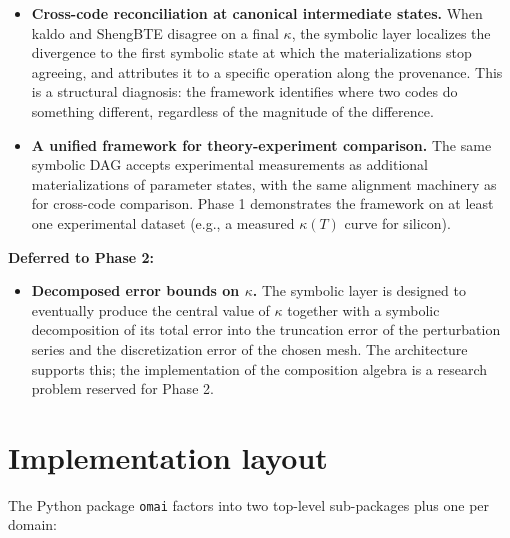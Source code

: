 \documentclass[11pt,a4paper]{article}
\begin{document}
\begin{itemize}[leftmargin=2em]
  \item \textbf{Cross-code reconciliation at canonical intermediate states.} When kaldo and
        ShengBTE disagree on a final $\kappa$, the symbolic layer localizes the divergence to the
        first symbolic state at which the materializations stop agreeing, and attributes it to a
        specific operation along the provenance. This is a structural diagnosis: the framework
        identifies where two codes do something different, regardless of the magnitude of the
        difference.
  \item \textbf{A unified framework for theory-experiment comparison.} The same symbolic DAG
        accepts experimental measurements as additional materializations of parameter states,
        with the same alignment machinery as for cross-code comparison. Phase 1 demonstrates the
        framework on at least one experimental dataset (e.g., a measured $\kappa(T)$ curve for
        silicon).
\end{itemize}

\noindent\textbf{Deferred to Phase 2:}
\begin{itemize}[leftmargin=2em]
  \item \textbf{Decomposed error bounds on $\kappa$.} The symbolic layer is designed to eventually
        produce the central value of $\kappa$ together with a symbolic decomposition of its
        total error into the truncation error of the perturbation series and the discretization
        error of the chosen mesh. The architecture supports this; the implementation of the
        composition algebra is a research problem reserved for Phase 2.
\end{itemize}

\section{Implementation layout}
\label{sec:layout}

The Python package \texttt{omai} factors into two top-level sub-packages
plus one per domain:
\end{document}
